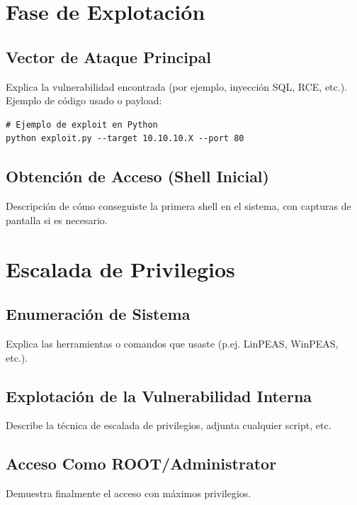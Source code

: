 \documentclass[12pt,a4paper]{report}
\begin{document}
\chapter{Fase de Explotación}

\section{Vector de Ataque Principal}
Explica la vulnerabilidad encontrada (por ejemplo, inyección SQL, RCE, etc.).  
Ejemplo de código usado o payload:
\begin{verbatim}
# Ejemplo de exploit en Python
python exploit.py --target 10.10.10.X --port 80
\end{verbatim}

\section{Obtención de Acceso (Shell Inicial)}
Descripción de cómo conseguiste la primera shell en el sistema, con capturas de pantalla si es necesario.

\chapter{Escalada de Privilegios}

\section{Enumeración de Sistema}
Explica las herramientas o comandos que usaste (p.ej. LinPEAS, WinPEAS, etc.).

\section{Explotación de la Vulnerabilidad Interna}
Describe la técnica de escalada de privilegios, adjunta cualquier script, etc.

\section{Acceso Como ROOT/Administrator}
Demuestra finalmente el acceso con máximos privilegios.
\end{document}
